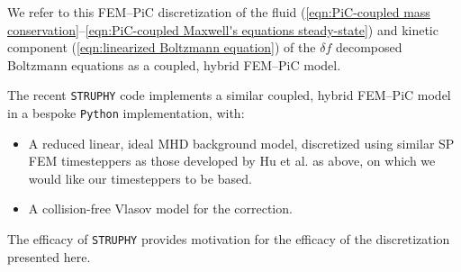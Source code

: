     We refer to this FEM--PiC discretization of the fluid (\ref{eqn:PiC-coupled mass conservation}--\ref{eqn:PiC-coupled Maxwell's equations steady-state}) and kinetic component (\ref{eqn:linearized Boltzmann equation}) of the $\delta\!f$ decomposed Boltzmann equations as a coupled, hybrid FEM--PiC model.

    The recent \texttt{STRUPHY} code \cite{Holderied_Possanner_Wang_2021, Holderied_2022, Li_et_al_2023} implements a similar coupled, hybrid FEM--PiC model in a bespoke \texttt{Python} implementation, with:
    \begin{itemize}
      \item  A reduced linear, ideal MHD background model, discretized using similar SP FEM timesteppers as those developed by Hu et al. \cite{Hu_Xu_2015, Hu_Ma_Xu_2017, Hu_Lee_Xu_2021, Green_et_al_2022, Laakmann_Farrell_Mitchell_22, Laakmann_Hu_Farrell_2022} as above, on which we would like our timesteppers to be based.
      \item  A collision-free Vlasov model for the correction.
    \end{itemize}
    The efficacy of \texttt{STRUPHY} provides motivation for the efficacy of the discretization presented here.
    